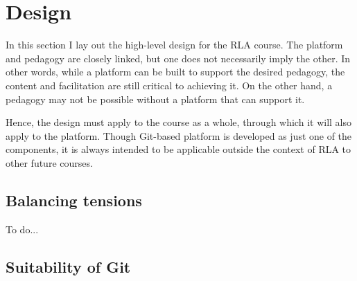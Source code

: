\documentclass[12pt,twoside,vi]{mitthesis}
\newcommand{\wip}[1]{{\color{red} To do...}}
\begin{document}
\section{Design}

In this section I lay out the high-level design for the RLA course. The platform and pedagogy are closely linked, but one does not necessarily imply the other. In other words, while a platform can be built to support the desired pedagogy, the content and facilitation are still critical to achieving it. On the other hand, a pedagogy may not be possible without a platform that can support it. 

Hence, the design must apply to the course as a whole, through which it will also apply to the platform. Though Git-based platform is developed as just one of the components, it is always intended to be applicable outside the context of RLA to other future courses.

\subsection{Balancing tensions}

\wip{We also aimed to foster a community that would extend into the later phases of the Accelerator. 

Finally, we rely on good software development practices and use popular tools where possible.

Communication. Communication lays the groundwork for the type of community formed. We aim to have instructors clearly communicate how to use the platform and be able to guide students throughout the course. We would like to allow natural and structured opportunities to ask questions and give feedback. General course information should be readily accessible to students.

Permissions. We will have to decide how to control authority to perform actions and visibility of content. On one hand, we believe that the platform should be as open as possible. This would allow students the opportunity to pursue their curiosities, to learn from each other's work, and to feel that they have a complete understanding of the platform. On the other hand, we would like to prevent either intentional or accidental actions that may destroy or hinder other participants' work. We also anticipate that sensitive topics would not be expressed without a private way of doing so and thus would like to allow for that.}

\subsection{Suitability of Git}
\end{document}
